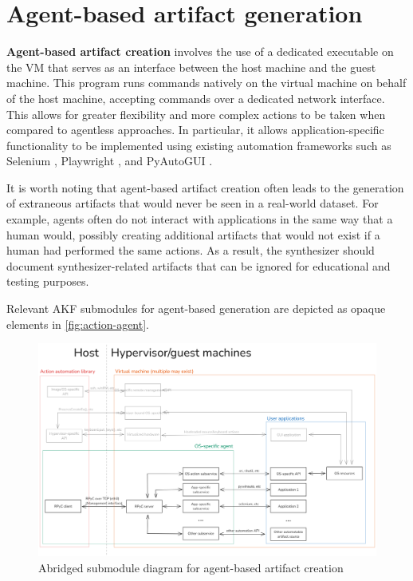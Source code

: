\documentclass[letterpaper,12pt]{report}
\begin{document}
\section{Agent-based artifact
generation}\label{agent-based-artifact-generation}

\textbf{Agent-based artifact creation} involves the use of a dedicated
executable on the VM that serves as an interface between the host
machine and the guest machine. This program runs commands natively on
the virtual machine on behalf of the host machine, accepting commands
over a dedicated network interface. This allows for greater flexibility
and more complex actions to be taken when compared to agentless
approaches. In particular, it allows application-specific functionality
to be implemented using existing automation frameworks such as Selenium
\cite{SeleniumHQSelenium2025}, Playwright
\cite{MicrosoftPlaywrightpython2025}, and PyAutoGUI
\cite{sweigartAsweigartPyautogui2025}.

It is worth noting that agent-based artifact creation often leads to the
generation of extraneous artifacts that would never be seen in a
real-world dataset. For example, agents often do not interact with
applications in the same way that a human would, possibly creating
additional artifacts that would not exist if a human had performed the
same actions. As a result, the synthesizer should document
synthesizer-related artifacts that can be ignored for educational and
testing purposes.

Relevant AKF submodules for agent-based generation are depicted as
opaque elements in \autoref{fig:action-agent}.

\begin{figure}[htbp]
\centering
\includegraphics[width=1\linewidth]{action-agent.png}
\caption{Abridged submodule diagram for agent-based artifact
creation}\label{fig:action-agent}
\end{figure}
\end{document}
